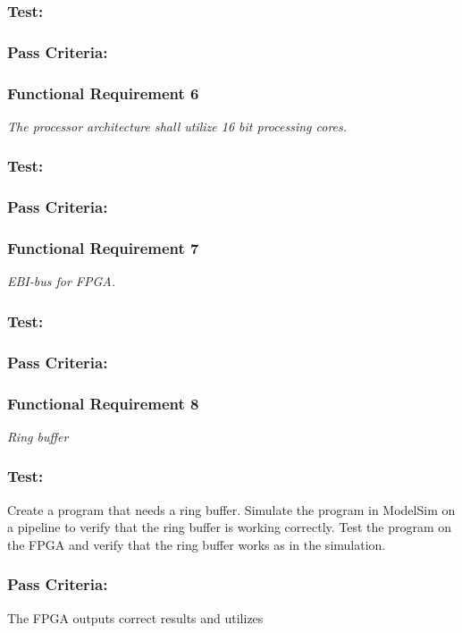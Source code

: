\subsubsection*{Test:}
\subsubsection*{Pass Criteria:}

\subsubsection*{Functional Requirement 6}
\textit{The processor architecture shall utilize 16 bit processing cores.}
\subsubsection*{Test:}
\subsubsection*{Pass Criteria:}


\subsubsection*{Functional Requirement 7}
\textit{EBI-bus for FPGA.}
\subsubsection*{Test:}
\subsubsection*{Pass Criteria:}


\subsubsection*{Functional Requirement 8}
\textit{Ring buffer}
\subsubsection*{Test:}
Create a program that needs a ring buffer. 
Simulate the program in ModelSim on a pipeline to verify that the ring buffer is working correctly.
Test the program on the FPGA and verify that the ring buffer works as in the simulation.
\subsubsection*{Pass Criteria:}
The FPGA outputs correct results and utilizes 


